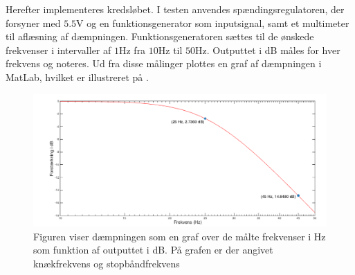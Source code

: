 Herefter implementeres kredsløbet. I testen anvendes spændingsregulatoren, der forsyner med $5.5$V og en funktionsgenerator som inputsignal, samt et multimeter til aflæsning af dæmpningen. Funktionsgeneratoren sættes til de ønskede frekvenser i intervaller af $1$Hz fra $10$Hz til $50$Hz. Outputtet i dB måles for hver frekvens og noteres. Ud fra disse målinger plottes en graf af dæmpningen i MatLab, hvilket er illustreret på .  

\begin{figure}[H]
	\centering
	\includegraphics[scale=0.4]{figures/cProblemloesning/Lavpas_Matlab.PNG}
	\caption{Figuren viser dæmpningen som en graf over de målte frekvenser i Hz som funktion af outputtet i dB. På grafen er der angivet knækfrekvens og stopbåndfrekvens}
	\label{fig:Lavpas_Matlab}
\end{figure}



